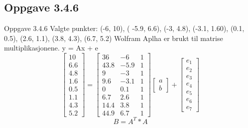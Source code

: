 \documentclass[a4paper,norsk]{article}
\begin{document}
\subsection{Oppgave 3.4.6}
Oppgave 3.4.6
Valgte punkter: (-6, 10), ( -5.9, 6.6), (-3, 4.8), (-3.1, 1.60), (0.1, 0.5), (2.6, 1.1), (3.8, 4.3), (6.7, 5.2)\newline
Wolfram Aplha er brukt til matrise multiplikasjonene. \newline
y = Ax + e \newline
\begin{equation*} 
\begin{bmatrix}10 \\ 6.6\\4.8\\1.6\\0.5\\1.1\\4.3\\5.2\end{bmatrix}
=\begin{bmatrix}36 & -6 & 1 \\ 43.8 & -5.9 & 1 \\9 & -3 & 1 \\ 9.6 & -3.1 & 1 \\0 & 0.1 & 1 \\6.7& 2.6 & 1 \\14.4 & 3.8 & 1 \\ 44.9 & 6.7 & 1\end{bmatrix}\begin{bmatrix}a\\b\end{bmatrix}
+ \begin{bmatrix} e_1 \\ e_2 \\ e_3 \\ e_4 \\ e_5 \\ e_6 \\ e_7\end{bmatrix}
\end{equation*}
\begin{equation*}B = A^{T} * A \end{equation*}
\end{document}

